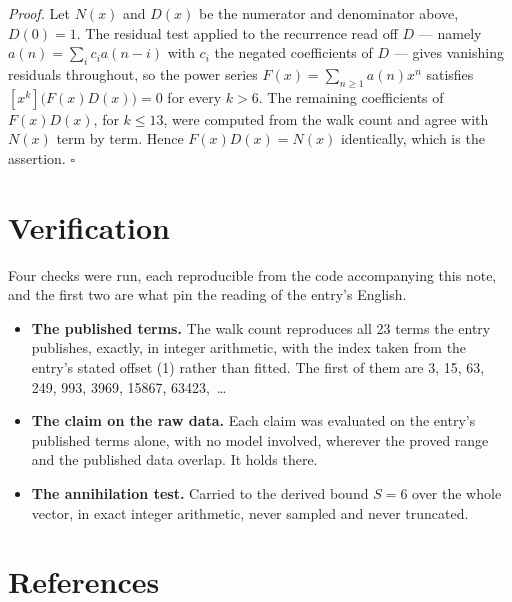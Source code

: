 \documentclass[11pt]{article}
\theoremstyle{definition}
\begin{document}
{\itshape Proof.} Let $N(x)$ and $D(x)$ be the numerator and denominator above, $D(0)=1$. The residual test applied to the recurrence read off $D$ --- namely $a(n) = \sum_i c_i a(n-i)$ with $c_i$ the negated coefficients of $D$ --- gives vanishing residuals throughout, so the power series $F(x)=\sum_{n\ge 1}a(n)x^n$ satisfies $[x^k]\bigl(F(x)D(x)\bigr) = 0$ for every $k > 6$. The remaining coefficients of $F(x)D(x)$, for $k \le 13$, were computed from the walk count and agree with $N(x)$ term by term. Hence $F(x)D(x) = N(x)$ identically, which is the assertion. $\square$

\section{Verification}

Four checks were run, each reproducible from the code accompanying this note, and the first two are what pin the reading of the entry's English.

\begin{itemize}

\item {\bfseries The published terms.} The walk count reproduces all 23 terms the entry publishes, exactly, in integer arithmetic, with the index taken from the entry's stated offset (1) rather than fitted. The first of them are 3, 15, 63, 249, 993, 3969, 15867, 63423,~\dots

\item {\bfseries The claim on the raw data.} Each claim was evaluated on the entry's published terms alone, with no model involved, wherever the proved range and the published data overlap. It holds there.

\item {\bfseries The annihilation test.} Carried to the derived bound $S = 6$ over the whole vector, in exact integer arithmetic, never sampled and never truncated.

\end{itemize}

\section{References}
\end{document}
